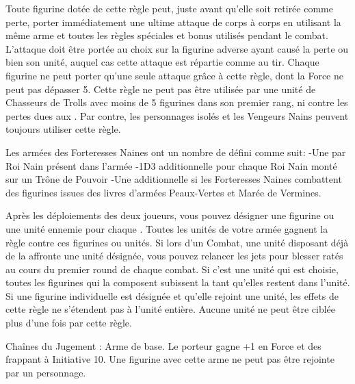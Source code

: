 \armyspecialruleentry{\comewithme}

Toute figurine dotée de cette règle peut, juste avant qu'elle soit retirée comme perte, porter immédiatement une ultime attaque de corps à corps en utilisant la même arme et toutes les règles spéciales et bonus utilisés pendant le combat. L'attaque doit être portée au choix sur la figurine adverse ayant causé la perte ou bien son unité, auquel cas cette attaque est répartie comme au tir. Chaque figurine ne peut porter qu'une seule attaque grâce à cette règle, dont la Force ne peut pas dépasser 5. Cette règle ne peut pas être utilisée par une unité de Chasseurs de Trolls avec moins de 5 figurines dans son premier rang, ni contre les pertes dues aux \impacthits{}. Par contre, les personnages isolés et les Vengeurs Nains peuvent toujours utiliser cette règle.

\armyspecialruleentry{\ancientgrudge}

Les armées des Forteresses Naines ont un nombre de  défini comme suit:
\newline-Une \ancientgrudge par Roi Nain présent dans l'armée
\newline-1D3 \ancientgrudge additionnelle pour chaque Roi Nain monté sur un Trône de Pouvoir
\newline-Une \ancientgrudge additionnelle si les Forteresses Naines combattent des figurines issues des livres d'armées Peaux-Vertes et Marée de Vermines.

Après les déploiements des deux joueurs, vous pouvez désigner une figurine ou une unité ennemie pour chaque \ancientgrudge. Toutes les unités de votre armée gagnent la règle \hatred contre ces figurines ou unités. Si lors d'un Combat, une unité disposant déjà de la \hatred affronte une unité désignée, vous pouvez relancer les jets pour blesser ratés au cours du premier round de chaque combat. Si c’est une unité qui est choisie, toutes les figurines qui la composent subissent la \hatred tant qu’elles restent dans l’unité. Si une figurine individuelle est désignée et qu'elle rejoint une unité, les effets de cette règle ne s’étendent pas à l’unité entière. Aucune unité ne peut être ciblée plus d'une fois par cette règle.

\armyarmoury


\begin{customdescription}
\item[Chaînes du Jugement :] Arme de base. Le porteur gagne +1 en Force et des  frappant à Initiative 10. Une figurine avec cette arme ne peut pas être rejointe par un personnage.
\end{customdescription}

